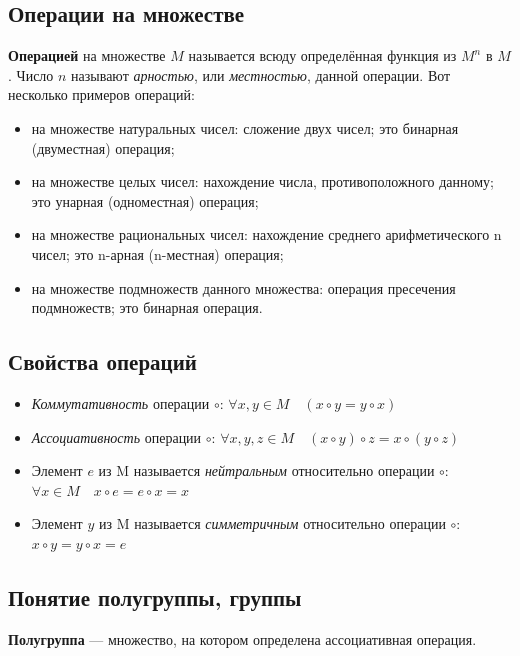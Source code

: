 \documentclass[a4paper]{article}
\begin{document}
    \newpage \begin{center}
                 \begin{Large}
                 \end{Large}
    \end{center}
    \subsection*{Операции на множестве}
    \textbf{Операцией} на множестве $M$ называется всюду
    определённая функция из $M^n$ в $M$. Число $n$ называют \textit{арностью}, или
    \textit{местностью}, данной операции.
    Вот несколько примеров операций:
    \begin{itemize}
        \item на множестве натуральных чисел: сложение двух чисел; это бинарная
        (двуместная) операция;
        \item на множестве целых чисел: нахождение числа, противоположного
        данному; это унарная (одноместная) операция;
        \item на множестве рациональных чисел: нахождение среднего арифметического
        n чисел; это n-арная (n-местная) операция;
        \item на множестве подмножеств данного множества: операция пресечения
        подмножеств; это бинарная операция.
    \end{itemize}

    \subsection*{Свойства операций}
    \begin{itemize}
        \item \textit{Коммутативность} операции $\circ$: $\forall x, y \in M \quad (x \circ y = y \circ x)$
        \item \textit{Ассоциативность} операции $\circ$: $\forall x, y, z \in M \quad (x \circ y) \circ z = x \circ (y \circ z)$
        \item Элемент $e$ из M называется \textit{нейтральным} относительно операции $\circ$: $\forall x \in M \quad x \circ e = e \circ x = x$
        \item Элемент $y$ из M называется \textit{симметричным} относительно операции $\circ$: $x \circ y = y \circ x = e$
    \end{itemize}

    \subsection*{Понятие полугруппы, группы}
    \textbf{Полугруппа} --- множество, на котором определена ассоциативная операция.
\end{document}
